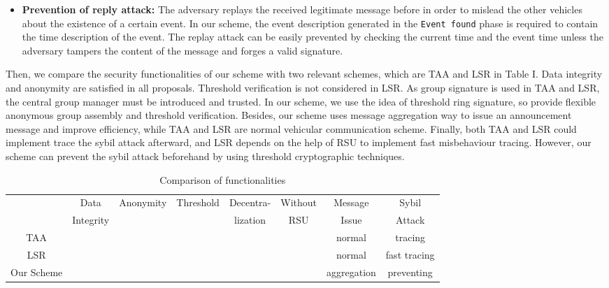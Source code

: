 \documentclass[a4paper]{article}
\begin{document}
\begin{itemize}
  \item \textbf{Prevention of reply attack:} The adversary replays the received legitimate message before in order to mislead the other vehicles about the existence of a certain event. In our scheme, the event description  generated in the \texttt{Event found} phase is required to contain the time description of the event. The replay attack can be easily prevented by checking the current time and the event time unless the adversary tampers the content of the message and forges a valid signature.
\end{itemize}
Then, we compare the security functionalities of our scheme with two relevant schemes, which are TAA \cite{CNW11} and LSR \cite{Lin13} in Table I. Data integrity and anonymity are satisfied in all proposals. Threshold verification is not considered in LSR. As group signature is used in TAA and LSR, the central group manager must be introduced and trusted. In our scheme, we use the idea of threshold ring signature, so provide flexible anonymous group assembly and threshold verification. Besides, our scheme uses message aggregation way to issue an announcement message and improve efficiency, while TAA and LSR are normal vehicular communication scheme. Finally, both TAA and LSR could implement trace the sybil attack afterward, and LSR depends on the help of RSU to implement fast misbehaviour tracing. However, our scheme can prevent the sybil attack beforehand by using threshold cryptographic techniques.
\begin{table*}
\caption{Comparison of functionalities}
\begin{center}
\scalebox{0.8}
{
\begin{tabular}{c|c c c c c c c}
  \toprule
                         &    Data   & Anonymity &  Threshold   &    Decentra-    &     Without     & Message   &    Sybil   \\
                         & Integrity &           &              &    lization     &      RSU        & Issue    &    Attack  \\
  \midrule
  TAA                    &  &  &     &   &        &  normal   &   tracing  \\
  LSR                    &  &  &&   &   &  normal   &   fast tracing  \\
  Our Scheme             &  &  &     &        &        &aggregation&  preventing\\
  \bottomrule
\end{tabular}
}
\end{center}
\end{table*}
\end{document}
